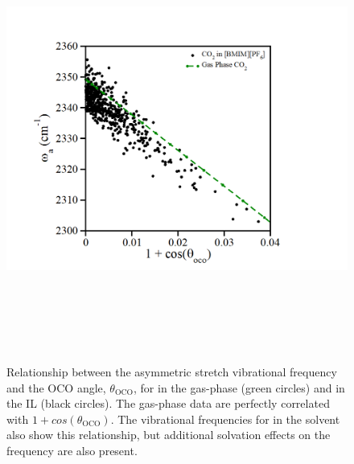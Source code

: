 \documentclass[]{article}
\begin{document}
\begin{figure}
  \centering
  \includegraphics[width=6.43125in,height=5.7659in]{figure1.png}
  \caption{Relationship between the  asymmetric stretch vibrational frequency and the OCO angle, \(\theta_{\text{OCO}}\), for  in the gas-phase (green circles) and in the \ce{[C4C1im][PF6]} IL (black circles). The gas-phase data are perfectly correlated with \(1 + cos(\theta_{\text{OCO}})\). The vibrational frequencies for  in the \ce{[C4C1im][PF6]} solvent also show this relationship, but additional solvation effects on the frequency are also present.}
  \label{paper_03:fig1}
\end{figure}
\end{document}
